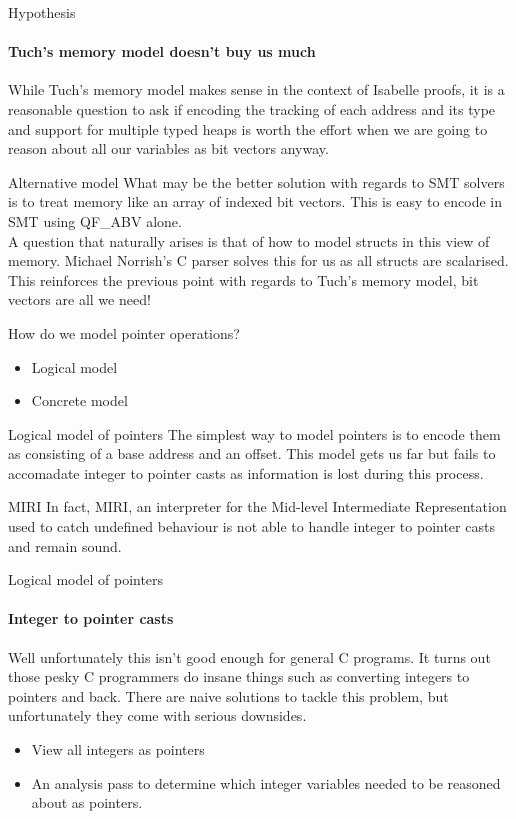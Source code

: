 \documentclass[aspectratio=169]{beamer}
\begin{document}
  \begin{frame}{Hypothesis}
    \framesubtitle{Tuch's memory model doesn't buy us much}
    While Tuch's memory model makes sense in the context of Isabelle proofs, it is a reasonable question to ask 
    if encoding the tracking of each address and its type and support for multiple typed heaps is worth the effort when we are going to reason about all our variables as bit vectors anyway. 
  \end{frame}

  \begin{frame}{Alternative model}
    What may be the better solution with regards to SMT solvers is to treat memory like an array of indexed bit vectors. 
    This is easy to encode in SMT using QF\_ABV alone.
    \\ \vspace{20pt}
    A question that naturally arises is that of how to model structs in this view of memory. 
    Michael Norrish's C parser solves this for us as all structs are scalarised.
    This reinforces the previous point with regards to Tuch's memory model, bit vectors are all we need!
  \end{frame}
  
  \begin{frame}{How do we model pointer operations?}
    \begin{itemize}
      \item Logical model 
      \item Concrete model 
    \end{itemize}
  \end{frame}

  \begin{frame}{Logical model of pointers}
    The simplest way to model pointers is to encode them as consisting of a base address and an offset. 
    This model gets us far but fails to accomadate integer to pointer casts as information is lost during this process. 
    \begin{alertblock}{MIRI}
      In fact, MIRI, an interpreter for the Mid-level Intermediate Representation used to catch undefined behaviour is not able to handle integer to pointer casts and remain sound.
    \end{alertblock}
  \end{frame}
  
  \begin{frame}{Logical model of pointers}
    \framesubtitle{Integer to pointer casts}
    Well unfortunately this isn't good enough for general C programs. It turns out those pesky C programmers do insane things such as 
    converting integers to pointers and back. There are naive solutions to tackle this problem, but unfortunately they come with serious downsides. 
    \begin{itemize}
      \item View all integers as pointers
      \item An analysis pass to determine which integer variables needed to be reasoned about as pointers. 
    \end{itemize}
  \end{frame}
\end{document}
